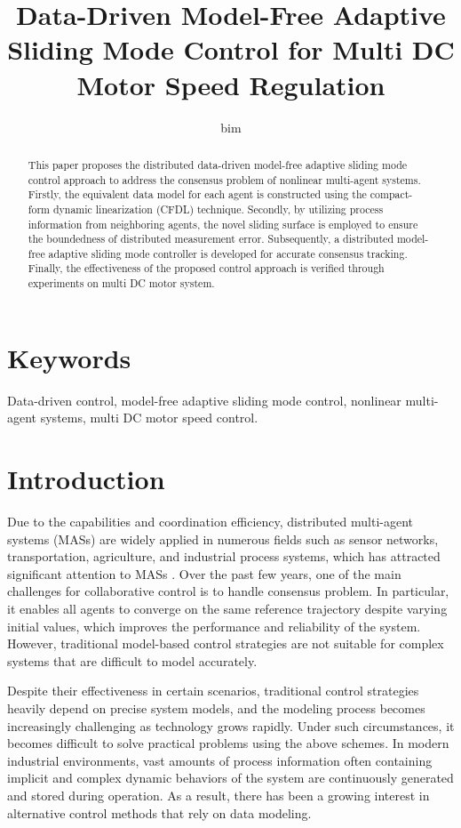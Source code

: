 \documentclass[journal,onecolumn]{IEEEtran}
\title{\LARGE Data-Driven Model-Free Adaptive Sliding Mode Control for Multi DC Motor Speed Regulation}
\author{bim}
\begin{document}
\maketitle

\begin{abstract}
    This paper proposes the distributed data-driven model-free adaptive sliding mode control approach to address the consensus problem of nonlinear multi-agent systems. Firstly, the equivalent data model for each agent is constructed using the compact-form dynamic linearization (CFDL) technique. Secondly, by utilizing process information from neighboring agents, the novel sliding surface is employed to ensure the boundedness of distributed measurement error. Subsequently, a distributed model-free adaptive sliding mode controller is developed for accurate consensus tracking. Finally, the effectiveness of the proposed control approach is verified through experiments on multi DC motor system.
\end{abstract}


\section*{Keywords}
Data-driven control, model-free adaptive sliding mode control, nonlinear multi-agent systems, multi DC motor speed control.

\section{Introduction}\label{section:1}

Due to the capabilities and coordination efficiency, distributed multi-agent systems (MASs) are widely applied in numerous fields such as sensor networks, transportation, agriculture, and industrial process systems, which has attracted significant attention to MASs \cite{1,2,3}. Over the past few years, one of the main challenges for collaborative control \cite{4,5,6} is to handle consensus problem. In particular, it enables all agents to converge on the same reference trajectory despite varying initial values, which improves the performance and reliability of the system. However, traditional model-based control strategies are not suitable for complex systems that are difficult to model accurately. 

Despite their effectiveness in certain scenarios, traditional control strategies \cite{10,11,12,13} heavily depend on precise system models, and the modeling process becomes increasingly challenging as technology grows rapidly. Under such circumstances, it becomes difficult to solve practical problems using the above schemes. In modern industrial environments, vast amounts of process information often containing implicit and complex dynamic behaviors of the system are continuously generated and stored during operation. As a result, there has been a growing interest in alternative control methods that rely on data modeling. 
\end{document}

